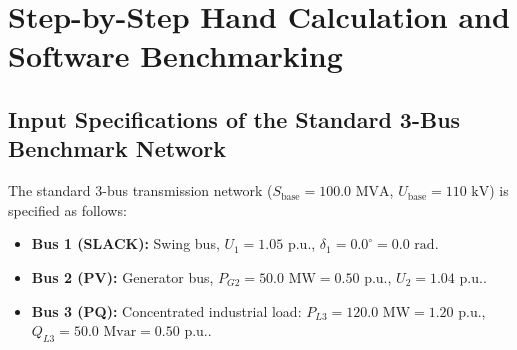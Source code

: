 \documentclass[12pt,a4paper,oneside]{report}
\begin{document}
\chapter{Step-by-Step Hand Calculation and Software Benchmarking}

\section{Input Specifications of the Standard 3-Bus Benchmark Network}
The standard 3-bus transmission network ($S_{\text{base}} = 100.0\text{ MVA}$, $U_{\text{base}} = 110\text{ kV}$) is specified as follows:
\begin{itemize}
    \item \textbf{Bus 1 (SLACK):} Swing bus, $U_1 = 1.05\text{ p.u.}$, $\delta_1 = 0.0^\circ = 0.0\text{ rad}$.
    \item \textbf{Bus 2 (PV):} Generator bus, $P_{G2} = 50.0\text{ MW} = 0.50\text{ p.u.}$, $U_2 = 1.04\text{ p.u.}$.
    \item \textbf{Bus 3 (PQ):} Concentrated industrial load: \newline
    $P_{L3} = 120.0\text{ MW} = 1.20\text{ p.u.}$, $Q_{L3} = 50.0\text{ Mvar} = 0.50\text{ p.u.}$.
\end{itemize}

\begin{table}[H]
\centering
\caption{Nodal specifications of the 3-bus benchmark transmission system.}
\label{tab:3bus_nodal_data}
\end{table}

\begin{table}[H]
\centering
\caption{Branch parameters of equivalent $\pi$ transmission lines ($S_{\text{base}} = 100.0\text{ MVA}$).}
\label{tab:3bus_branch_data}
\end{table}
\end{document}
